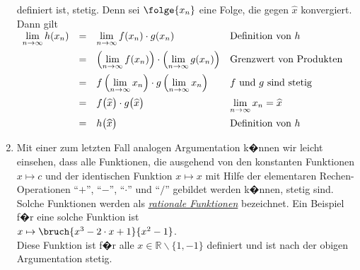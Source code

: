 \begin{enumerate}
      definiert ist, stetig.  Denn sei $\folge{x_n}$ eine Folge, die gegen $\widehat{x}$
      konvergiert.  Dann gilt
      \\[0.2cm]
      \hspace*{1.3cm}      
      $
      \begin{array}[t]{lcll}
            \lim\limits_{n\rightarrow\infty} h(x_n) 
      & = & \lim\limits_{n\rightarrow\infty} f(x_n) \cdot g(x_n) & \mbox{Definition von $h$} \\[0.3cm] 
      & = & \left(\lim\limits_{n\rightarrow\infty} f(x_n)\right) \cdot \left(\lim\limits_{n\rightarrow\infty} g(x_n)\right) &
            \mbox{Grenzwert von Produkten} \\[0.3cm] 
      & = & f\left(\lim\limits_{n\rightarrow\infty} x_n\right) \cdot g\left(\lim\limits_{n\rightarrow\infty} x_n\right) &
            \mbox{$f$ und $g$ sind stetig} \\[0.3cm] 
      & = & f\bigr(\widehat{x}\bigr) \cdot g\bigr(\widehat{x}\bigr) &
            \lim\limits_{n\rightarrow\infty} x_n = \widehat{x} \\[0.3cm] 
      & = & h\bigl(\widehat{x}\bigr) & \mbox{Definition von $h$}
      \end{array}
      $
      
\item Mit einer zum letzten Fall analogen Argumentation k�nnen wir leicht einsehen, dass alle Funktionen,
      die ausgehend von den konstanten Funktionen $x \mapsto c$ und der identischen
      Funktion $x \mapsto x$ mit Hilfe der elementaren Rechen-Operationen 
      ``$+$'', ``$-$'', ``$\cdot $'' und ``$/$'' gebildet werden k�nnen, stetig sind.  Solche
      Funktionen werden als \href{http://de.wikipedia.org/wiki/Rationale_Funktion}{\emph{rationale Funktionen}} bezeichnet.
      Ein       Beispiel f�r eine solche Funktion ist 
      \\[0.2cm]
      \hspace*{1.3cm}      
      $x \mapsto \bruch{x^3 - 2\cdot x +1}{x^2 -1}$.
      \\[0.2cm]
      Diese Funktion ist f�r alle $x\in\mathbb{R} \backslash \{1,-1\}$ definiert und ist
      nach der obigen Argumentation stetig.



\end{enumerate}
